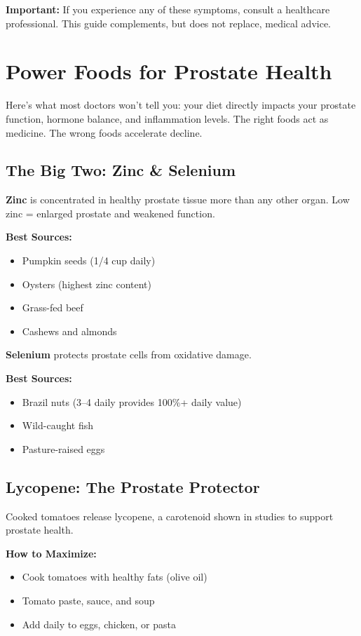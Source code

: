 \documentclass[11pt,oneside,openany]{book}
\begin{document}
\textbf{Important:} If you experience any of these symptoms, consult a healthcare professional. This guide complements, but does not replace, medical advice.

\clearpage

\chapter*{Power Foods for Prostate Health}

Here's what most doctors won't tell you: your diet directly impacts your prostate function, hormone balance, and inflammation levels. The right foods act as medicine. The wrong foods accelerate decline.

\section*{The Big Two: Zinc \& Selenium}

\textbf{Zinc} is concentrated in healthy prostate tissue more than any other organ. Low zinc = enlarged prostate and weakened function.

\textbf{Best Sources:}
\begin{itemize}[leftmargin=*]
\item Pumpkin seeds (1/4 cup daily)
\item Oysters (highest zinc content)
\item Grass-fed beef
\item Cashews and almonds
\end{itemize}

\textbf{Selenium} protects prostate cells from oxidative damage.

\textbf{Best Sources:}
\begin{itemize}[leftmargin=*]
\item Brazil nuts (3--4 daily provides 100\%+ daily value)
\item Wild-caught fish
\item Pasture-raised eggs
\end{itemize}

\section*{Lycopene: The Prostate Protector}
Cooked tomatoes release lycopene, a carotenoid shown in studies to support prostate health.

\textbf{How to Maximize:}
\begin{itemize}[leftmargin=*]
\item Cook tomatoes with healthy fats (olive oil)
\item Tomato paste, sauce, and soup
\item Add daily to eggs, chicken, or pasta
\end{itemize}
\end{document}
